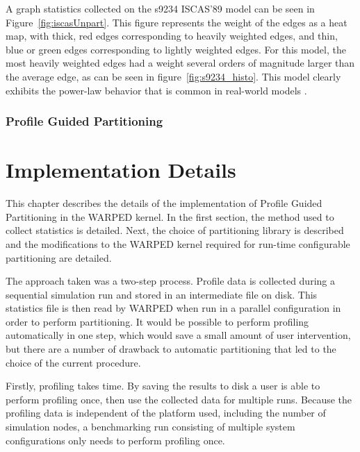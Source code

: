 \documentclass[11pt]{book}
\begin{document}
A graph statistics collected on the s9234 ISCAS’89 model can be seen in Figure~\ref{fig:iscasUnpart}. This figure represents the weight of the edges as a heat map, with thick, red edges corresponding to heavily weighted edges, and thin, blue or green edges corresponding to lightly weighted edges. For this model, the most heavily weighted edges had a weight several orders of magnitude larger than the average edge, as can be seen in figure~\ref{fig:s9234_histo}. This model clearly exhibits the power-law behavior that is common in real-world models \cite{clauset-09}.

\subsection{Profile Guided Partitioning}

\chapter{Implementation Details}\label{detailedImplementation}

This chapter describes the details of the implementation of Profile Guided Partitioning in the WARPED kernel. In the first section, the method used to collect statistics is detailed. Next, the choice of partitioning library is described and the modifications to the WARPED kernel required for run-time configurable partitioning are detailed.

The approach taken was a two-step process. Profile data is collected during a sequential simulation run and stored in an intermediate file on disk. This statistics file is then read by WARPED when run in a parallel configuration in order to perform partitioning. It would be possible to perform profiling automatically in one step, which would save a small amount of user intervention, but there are a number of drawback to automatic partitioning that led to the choice of the current procedure.

Firstly, profiling takes time. By saving the results to disk a user is able to perform profiling once, then use the collected data for multiple runs. Because the profiling data is independent of the platform used, including the number of simulation nodes, a benchmarking run consisting of multiple system configurations only needs to perform profiling once. 
\end{document}
